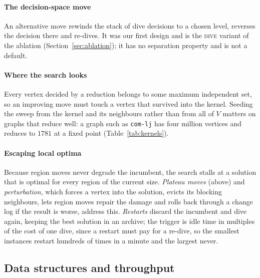 \documentclass[pdflatex,sn-mathphys-num]{sn-jnl}
\theoremstyle{thmstyleone}%
\theoremstyle{thmstyletwo}%
\begin{document}
\paragraph{The decision-space move} An alternative move rewinds the stack of dive
decisions to a chosen level, reverses the decision there and re-dives. It was our
first design and is the \textsc{dive} variant of the ablation
(Section~\ref{sec:ablation}); it has no separation property and is not a default.

\paragraph{Where the search looks} Every vertex decided by a reduction belongs
to some maximum independent set, so an improving move must touch a vertex that
survived into the kernel. Seeding the sweep from the kernel and its neighbours
rather than from all of $V$ matters on graphs that reduce well: a graph such as
\texttt{com-lj} has four million vertices and reduces to $1781$ at a fixed point
(Table~\ref{tab:kernels}).

\paragraph{Escaping local optima} Because region moves never degrade the incumbent,
the search stalls at a solution that is optimal for every region of the current
size. \emph{Plateau moves} (above) and \emph{perturbation}, which forces a vertex into
the solution, evicts its blocking neighbours, lets region moves repair the damage and
rolls back through a change log if the result is worse, address this. \emph{Restarts}
discard the incumbent and dive again, keeping the best solution in an archive; the
trigger is idle time in multiples of the cost of one dive, since a restart must pay for
a re-dive, so the smallest instances restart hundreds of times in a minute and the
largest never.

\subsection{Data structures and throughput}
\label{sec:implementation}
\end{document}
